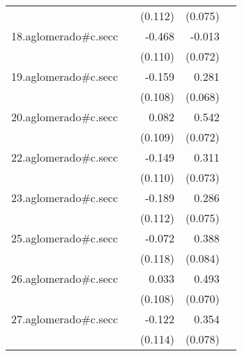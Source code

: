 {\begin{longtable}{l*{4}{D{.}{.}{-1}}}
            &                     &     (0.112)         &     (0.075)         &                     \\
\addlinespace
18.aglomerado#c.secc&                     &      -0.468\sym{***}&      -0.013         &                     \\
            &                     &     (0.110)         &     (0.072)         &                     \\
\addlinespace
19.aglomerado#c.secc&                     &      -0.159         &       0.281\sym{***}&                     \\
            &                     &     (0.108)         &     (0.068)         &                     \\
\addlinespace
20.aglomerado#c.secc&                     &       0.082         &       0.542\sym{***}&                     \\
            &                     &     (0.109)         &     (0.072)         &                     \\
\addlinespace
22.aglomerado#c.secc&                     &      -0.149         &       0.311\sym{***}&                     \\
            &                     &     (0.110)         &     (0.073)         &                     \\
\addlinespace
23.aglomerado#c.secc&                     &      -0.189         &       0.286\sym{***}&                     \\
            &                     &     (0.112)         &     (0.075)         &                     \\
\addlinespace
25.aglomerado#c.secc&                     &      -0.072         &       0.388\sym{***}&                     \\
            &                     &     (0.118)         &     (0.084)         &                     \\
\addlinespace
26.aglomerado#c.secc&                     &       0.033         &       0.493\sym{***}&                     \\
            &                     &     (0.108)         &     (0.070)         &                     \\
\addlinespace
27.aglomerado#c.secc&                     &      -0.122         &       0.354\sym{***}&                     \\
            &                     &     (0.114)         &     (0.078)         &                     \\

\end{longtable}}
